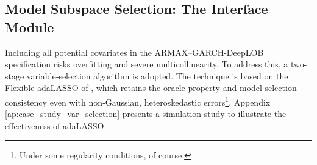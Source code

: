 \documentclass{rQUF2e}
\theoremstyle{plain}
\theoremstyle{definition}
\theoremstyle{remark}
\begin{document}






\subsection{Model Subspace Selection: The Interface Module}
\label{subsec:covariates_selection}

Including all potential covariates in the ARMAX–GARCH-DeepLOB specification risks overfitting and severe multicollinearity. To address this, a two-stage variable‐selection algorithm is adopted. The technique is based on the Flexible adaLASSO of \citet{MEDEIROS2016255}, which retains the oracle property and model‐selection consistency even with non‐Gaussian, heteroskedastic errors\footnote{Under some regularity conditions, of course.}. Appendix \ref{ap:case_study_var_selection} presents a simulation study to illustrate the effectiveness of adaLASSO.

\end{document}
